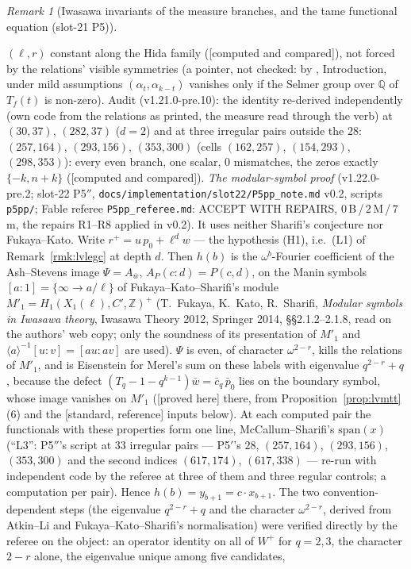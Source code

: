 \documentclass[11pt]{article}
\theoremstyle{remark}
\newtheorem{remark}[theorem]{Remark}
\newcommand{\Z}{\mathbb{Z}}
\newcommand{\Q}{\mathbb{Q}}
\newcommand{\PROVED}{\textsf{[proved here]}}
\newcommand{\STD}{\textsf{[standard, reference]}}
\newcommand{\CMPD}{\textsf{[computed and compared]}}   %
\begin{document}
\begin{remark}[Iwasawa invariants of the measure branches, and the tame functional equation (slot-21 P5)]
\begin{enumerate}
  $(\ell,r)$ constant along the Hida family (\CMPD), not forced by the relations' visible symmetries (a pointer, not checked: by \cite{sharifi_reciprocity}, Introduction, under mild assumptions $(\alpha_t,\alpha_{k-t})$ vanishes
  only if the Selmer group over $\Q$ of $T_f(t)$ is non-zero). Audit (v1.21.0-pre.10): the identity re-derived independently (own code from the relations as printed, the measure read through the verb) at $(30,37)$,
  $(282,37)$ ($d=2$) and at three irregular pairs outside the $28$: $(257,164)$, $(293,156)$, $(353,300)$ (cells $(162,257)$, $(154,293)$, $(298,353)$): every even branch, one scalar, $0$ mismatches, the zeros exactly $\{-k,n+k\}$ (\CMPD). \emph{The modular-symbol proof} (v1.22.0-pre.2; slot-22 P5$''$, \texttt{docs/implementation/slot22/P5pp\_note.md} v0.2, scripts \texttt{p5pp/}; Fable referee \texttt{P5pp\_referee.md}: ACCEPT WITH REPAIRS,
  $0$\,B\,/\,$2$\,M\,/\,$7$\,m, the repairs R1--R8 applied in v0.2). It uses neither Sharifi's conjecture nor Fukaya--Kato. Write $r^{+}=u\,p_0+\ell^{d}w$ --- the hypothesis (H1), i.e.\ (L1) of
  Remark~\ref{rmk:lvlegc} at depth $d$. Then $h(b)$ is the $\omega^{b}$-Fourier coefficient of the Ash--Stevens image $\Psi=A_{\bar w}$, $A_P(c:d)=P(c,d)$, on the Manin symbols $[a:1]=\{\infty\to a/\ell\}$ of
  Fukaya--Kato--Sharifi's module $M'_1=H_1(X_1(\ell),C',\Z)^{+}$ (T.~Fukaya, K.~Kato, R.~Sharifi, \emph{Modular symbols in Iwasawa theory}, Iwasawa Theory 2012, Springer 2014, \S\S2.1.2--2.1.8, read on the authors'
  web copy; only the soundness of its presentation of $M'_1$ and $\langle a\rangle^{-1}[u:v]=[au:av]$ are used). $\Psi$ is even, of character $\omega^{2-r}$, kills the relations of $M'_1$, and is Eisenstein for Merel's sum on these labels with
  eigenvalue $q^{2-r}+q$, because the defect $(T_q-1-q^{k-1})\bar w=\bar c_q\,\bar p_0$ lies on the boundary symbol, whose image vanishes on $M'_1$ (\PROVED{} there, from Proposition~\ref{prop:lvmtt}(6) and the \STD{} inputs below). At each
  computed pair the functionals with these properties form one line, McCallum--Sharifi's $\mathrm{span}(x)$ (``L3'': P5$''$'s script at $33$ irregular pairs --- P5$'$'s $28$, $(257,164)$, $(293,156)$, $(353,300)$ and the second indices $(617,174)$, $(617,338)$ ---
  re-run with independent code by the referee at three of them and three regular controls; a computation per pair). Hence $h(b)=y_{b+1}=c\cdot x_{b+1}$. The two convention-dependent steps (the eigenvalue $q^{2-r}+q$ and the character
  $\omega^{2-r}$, derived from Atkin--Li and Fukaya--Kato--Sharifi's normalisation) were verified directly by the referee on the object: an operator identity on all of $W^{+}$ for $q=2,3$, the character $2-r$ alone, the eigenvalue unique among five candidates,

\end{enumerate}
\end{remark}
\end{document}
